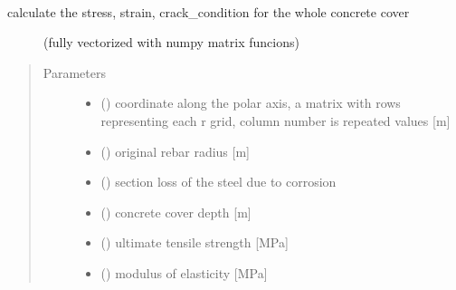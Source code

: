 \documentclass[letterpaper,10pt,english]{sphinxmanual}
\begin{document}
\begin{fulllineitems}
\label{\detokenize{cracking:cracking.strain_stress_crack_f}}~\begin{description}
\item[{calculate the stress, strain, crack\_condition for the whole concrete cover}] \leavevmode
\sphinxAtStartPar
(fully vectorized with numpy matrix funcions)

\end{description}
\begin{quote}\begin{description}
\item[{Parameters}] \leavevmode\begin{itemize}
\item {} 
\sphinxAtStartPar
{} () \textendash{} coordinate along the polar axis, a matrix with rows representing each r grid,
column number is repeated values {[}m{]}

\item {} 
\sphinxAtStartPar
{} () \textendash{} original rebar radius {[}m{]}

\item {} 
\sphinxAtStartPar
{} () \textendash{} section loss of the steel due to corrosion

\item {} 
\sphinxAtStartPar
{} () \textendash{} concrete cover depth {[}m{]}

\item {} 
\sphinxAtStartPar
{} () \textendash{} ultimate tensile strength {[}MPa{]}

\item {} 
\sphinxAtStartPar
{} () \textendash{} modulus of elasticity {[}MPa{]}


\end{itemize}
\end{description}
\end{quote}
\end{fulllineitems}
\end{document}
